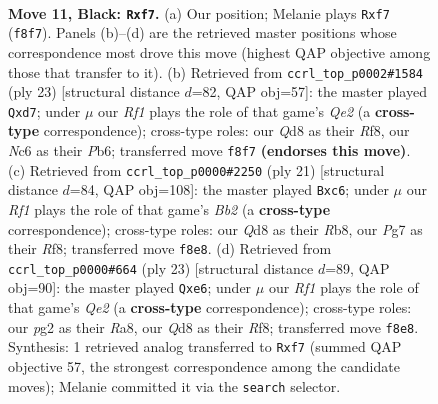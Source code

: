 \documentclass[11pt]{article}
\begin{document}
\begin{figure}[p]\centering
\begin{subfigure}{0.46\textwidth}\centering
\resizebox{\linewidth}{!}{%
\newchessgame
\chessboard[
  setfen={r2q1rk1/1bp2Npp/pbnp1n2/1p2p3/3PP3/1BP5/PP3PPP/RNBQR1K1 b - - 0 11},
  showmover=false,
  pgfstyle=straightmove, color=movearrow, markmove={f8-f7}
]}
\caption{}
\end{subfigure}\hfill
\begin{subfigure}{0.46\textwidth}\centering
\resizebox{\linewidth}{!}{%
\newchessgame
\chessboard[
  setfen={r4rk1/pb1Nqppp/1p1bp3/2pn4/3P4/1P1BP3/PB2QPPP/RN3RK1 b - - 0 12},
  showmover=false,
  pgfstyle=straightmove, color=movearrow, markmove={e7-d7}
]}
\caption{}
\end{subfigure}
\\[4pt]
\begin{subfigure}{0.46\textwidth}\centering
\resizebox{\linewidth}{!}{%
\newchessgame
\chessboard[
  setfen={1r1q1rk1/pb1pbppp/2N1pn2/2p5/1p2PP2/2PP1N2/PP2B1PP/R1BQ1RK1 b - - 0 11},
  showmover=false,
  pgfstyle=straightmove, color=movearrow, markmove={b7-c6}
]}
\caption{}
\end{subfigure}\hfill
\begin{subfigure}{0.46\textwidth}\centering
\resizebox{\linewidth}{!}{%
\newchessgame
\chessboard[
  setfen={r4rk1/pp2qpbp/2ppNnp1/4n3/2P1P2P/2N1BP2/PP1Q2P1/R3KB1R b KQ - 0 12},
  showmover=false,
  pgfstyle=straightmove, color=movearrow, markmove={e7-e6}
]}
\caption{}
\end{subfigure}
\caption{\textbf{Move 11, Black: \texttt{Rxf7}.} (a) Our position; Melanie plays \texttt{Rxf7} (\texttt{f8f7}). Panels (b)--(d) are the retrieved master positions whose correspondence most drove this move (highest QAP objective among those that transfer to it). (b) Retrieved from \texttt{ccrl\_top\_p0002\#1584} (ply 23) [structural distance $d$=82, QAP obj=57]: the master played \texttt{Qxd7}; under $\mu$ our \emph{Rf1} plays the role of that game's \emph{Qe2} (a \textbf{cross-type} correspondence); cross-type roles: our \emph{Q}d8 as their \emph{R}f8, our \emph{N}c6 as their \emph{P}b6; transferred move \texttt{f8f7} \textbf{(endorses this move)}. (c) Retrieved from \texttt{ccrl\_top\_p0000\#2250} (ply 21) [structural distance $d$=84, QAP obj=108]: the master played \texttt{Bxc6}; under $\mu$ our \emph{Rf1} plays the role of that game's \emph{Bb2} (a \textbf{cross-type} correspondence); cross-type roles: our \emph{Q}d8 as their \emph{R}b8, our \emph{P}g7 as their \emph{R}f8; transferred move \texttt{f8e8}. (d) Retrieved from \texttt{ccrl\_top\_p0000\#664} (ply 23) [structural distance $d$=89, QAP obj=90]: the master played \texttt{Qxe6}; under $\mu$ our \emph{Rf1} plays the role of that game's \emph{Qe2} (a \textbf{cross-type} correspondence); cross-type roles: our \emph{p}g2 as their \emph{R}a8, our \emph{Q}d8 as their \emph{R}f8; transferred move \texttt{f8e8}. Synthesis: 1 retrieved analog transferred to \texttt{Rxf7} (summed QAP objective 57, the strongest correspondence among the candidate moves); Melanie committed it via the \texttt{search} selector.}
\label{fig:thought-m21}
\end{figure}
\end{document}
